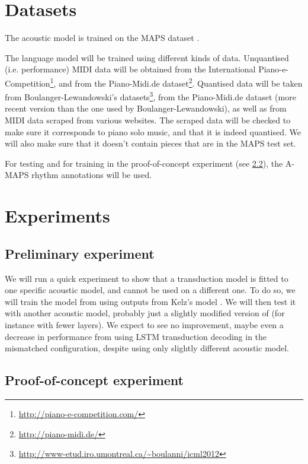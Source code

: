 \documentclass{article}
\begin{document}
\section{Datasets}

The acoustic model is trained on the MAPS dataset \citep{emiya2010multipitch}.

The language model will be trained using different kinds of data.
Unquantised (i.e. performance) MIDI data will be obtained from the International Piano-e-Competition\footnote{\url{http://piano-e-competition.com/}},
and from the Piano-Midi.de dataset\footnote{\url{http://piano-midi.de/}}.
Quantised data will be taken from Boulanger-Lewandowski's datasets\footnote{\url{http://www-etud.iro.umontreal.ca/~boulanni/icml2012}},
from the Piano-Midi.de dataset (more recent version than the one used by Boulanger-Lewandowski),
as well as from MIDI data scraped from various websites.
The scraped data will be checked to make sure it corresponds to piano solo music, and that it is indeed quantised.
We will also make sure that it doesn't contain pieces that are in the MAPS test set.

For testing and for training in the proof-of-concept experiment (see \ref{sec:POC}), the A-MAPS \citep{ycart2018maps} rhythm annotations will be used.

\section{Experiments}

\subsection{Preliminary experiment}

We will run a quick experiment to show that a transduction model is fitted to one specific acoustic model, and cannot be used on a different one.
To do so, we will train the model from \citep{ycart2018polyphonic} using outputs from Kelz's model \citep{Kelz2016}.
We will then test it with another acoustic model, probably just a slightly modified version of  \citep{Kelz2016} (for instance with fewer layers).
We expect to see no improvement, maybe even a decrease in performance from using LSTM transduction decoding in the mismatched configuration, despite using only slightly different acoustic model.

\subsection{Proof-of-concept experiment}
\label{sec:POC}
\end{document}
